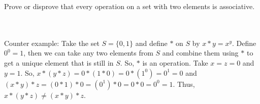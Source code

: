 Prove or disprove that every operation on a set with two elements is associative.\\\\

\begin{solution}\renewcommand{\qedsymbol}{}\ \\
    Counter example: Take the set $S=\{0,1\}$ and define $*$ on $S$ by $x*y=x^y$. Define $0^0=1$, then
    we can take any two elements from $S$ and combine them using $*$ to get a unique element that is
    still in $S$. So, $*$ is an operation. Take $x=z=0$ and $y=1$. So, $x*(y*z)=0*(1*0)=0*(1^0)=0^1=0$
    and $(x*y)*z=(0*1)*0=(0^1)*0=0*0=0^0=1$. Thus, $x*(y*z)\neq(x*y)*z$.

\end{solution}